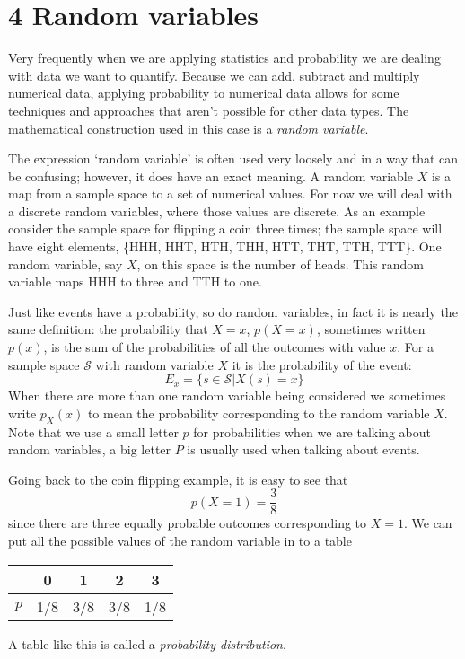 \documentclass[11pt,a4paper]{scrartcl}
\begin{document}
\section*{4 Random variables}

Very frequently when we are applying statistics and probability we are
dealing with data we want to quantify. Because we can add, subtract
and multiply numerical data, applying probability to numerical data allows for some
techniques and approaches that aren't possible for other data
types. The mathematical construction used in this case is a
\textsl{random variable}.

The expression \lq{}random variable\rq{} is often used very loosely
and in a way that can be confusing; however, it does have an exact
meaning. A random variable $X$ is a map from a sample space to a set
of numerical values. For now we will deal with a discrete random
variables, where those values are discrete. As an example consider the
sample space for flipping a coin three times; the sample space will
have eight elements, \{HHH, HHT, HTH, THH, HTT, THT, TTH, TTT\}. One
random variable, say $X$, on this space is the number of heads. This
random variable maps HHH to three and TTH to one.

Just like events have a probability, so do random variables, in fact
it is nearly the same definition: the probability that $X=x$,
$p(X=x)$, sometimes written $p(x)$, is the sum of the probabilities of
all the outcomes with value $x$. For a sample space $\mathcal{S}$ with
random variable $X$ it is the probability of the event:
\begin{equation}
E_x=\{s\in \mathcal{S}|X(s)=x\}
\end{equation}
When there are more than one random variable being considered we
sometimes write $p_X(x)$ to mean the probability corresponding to the
random variable $X$. Note that we use a small letter $p$ for
probabilities when we are talking about random variables, a big letter
$P$ is usually used when talking about events.

Going back to the coin flipping example, it is easy to see that 
\begin{equation}
p(X=1)=\frac{3}{8}
\end{equation}
since there are three equally probable outcomes corresponding to
$X=1$. We can put all the possible values of the random variable in to
a table
\begin{center}
\begin{tabular}{c|cccc}
&0&1&2&3\\
\hline
$p$&1/8&3/8&3/8&1/8
\end{tabular}
\end{center}
A table like this is called a \textsl{probability distribution}.
\end{document}
